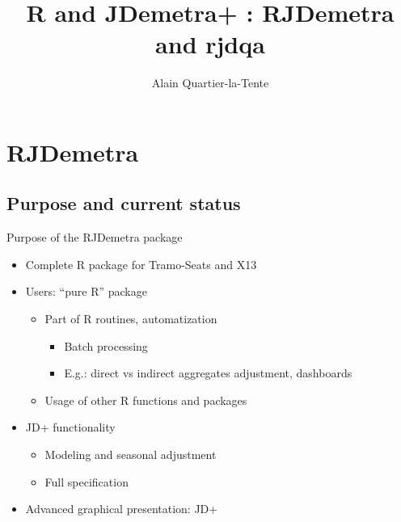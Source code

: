 \documentclass[10pt,xcolor=table,color={dvipsnames,usenames},ignorenonframetext,usepdftitle=false,french]{beamer}
\title{R and JDemetra+ : RJDemetra and rjdqa}
\author{Alain Quartier-la-Tente}
\date{}
\providecommand{\tightlist}{%
  \setlength{\parskip}{0pt}
  }
\begin{document}

\section{RJDemetra}\label{rjdemetra}

\subsection{Purpose and current
status}\label{purpose-and-current-status}

\begin{frame}{Purpose of the RJDemetra package}

\begin{itemize}
\tightlist
\item
  Complete R package for Tramo-Seats and X13\\
\item
  Users: ``pure R'' package

  \begin{itemize}
  \tightlist
  \item
    Part of R routines, automatization

    \begin{itemize}
    \tightlist
    \item
      Batch processing
    \item
      E.g.: direct vs indirect aggregates adjustment, dashboards
    \end{itemize}
  \item
    Usage of other R functions and packages
  \end{itemize}
\item
  JD+ functionality

  \begin{itemize}
  \tightlist
  \item
    Modeling and seasonal adjustment
  \item
    Full specification
  \end{itemize}
\item
  Advanced graphical presentation: JD+
\end{itemize}

\end{frame}
\end{document}
